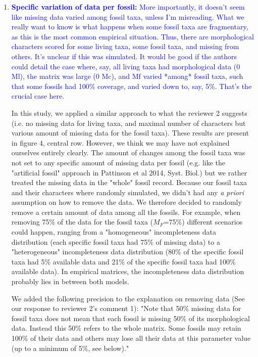 \documentclass[12pt,letterpaper]{article}
\begin{document}
\begin{enumerate}
\item{\textcolor{blue}{\textbf{Specific variation of data per fossil:} More importantly, it doesn't seem like missing data varied among fossil taxa, unless I'm misreading. What we really want to know is what happens when some fossil taxa are fragmentary, as this is the most common empirical situation. Thus, there are morphological characters scored for some living taxa, some fossil taxa, and missing from others. It's unclear if this was simulated. It would be good if the authors could detail the case where, say, all living taxa had morphological data (0 Ml), the matrix was large (0 Mc), and Mf varied *among* fossil taxa, such that some fossils had 100\% coverage, and varied down to, say, 5\%. That's the crucial case here.}}

In this study, we applied a similar approach to what the reviewer 2 suggests (i.e. no missing data for living taxa, and maximal number of characters but various amount of missing data for the fossil taxa). 
These results are present in figure 4, central row.
However, we think we may have not explained ourselves entirely clearly. The amount of changes among the fossil taxa was not set to any specific amount of missing data per fossil (e.g. like the "artificial fossil" approach in Pattinson et al 2014, Syst. Biol.) but we rather treated the missing data in the "whole" fossil record.
Because our fossil taxa and their characters where randomly simulated, we didn't had any \textit{a priori} assumption on how to remove the data.
We therefore decided to randomly remove a certain amount of data among all the fossils.
For example, when removing 75\% of the data for the fossil taxa ($M_F$=75\%) different scenarios could happen, ranging from a "homogeneous" incompleteness data distribution (each specific fossil taxa had 75\% of missing data) to a "heterogeneous" incompleteness data distribution  (80\% of the specific fossil taxa had 5\% available data and 21\% of the specific fossil taxa had 100\% available data).
In empirical matrices, the incompleteness data distribution probably lies in between both models.


We added the following precision to the explanation on removing data (See our response to reviewer 2's comment 1):
"Note that 50\% missing data for fossil taxa does not mean that each fossil is missing 50\% of its morphological data.
Instead this 50\% refers to the whole matrix.
Some fossils may retain 100\% of their data and others may lose all their data at this parameter value (up to a minimum of 5\%, see below)."



\end{enumerate}
\end{document}

